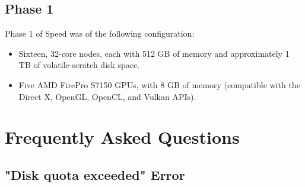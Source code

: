 \documentclass{easychair}
\begin{document}
\subsection{Phase 1}

Phase 1 of Speed was of the following configuration:

\begin{itemize}
\item
Sixteen, 32-core nodes, each with 512 GB of memory and approximately 1 TB of volatile-scratch disk space. 
\item
Five AMD FirePro S7150 GPUs, with 8 GB of memory (compatible with the Direct X, OpenGL, OpenCL, and Vulkan APIs). 
\end{itemize}

\section{Frequently Asked Questions}
\label{sect:faqs}

\subsection{"Disk quota exceeded" Error}
\end{document}
